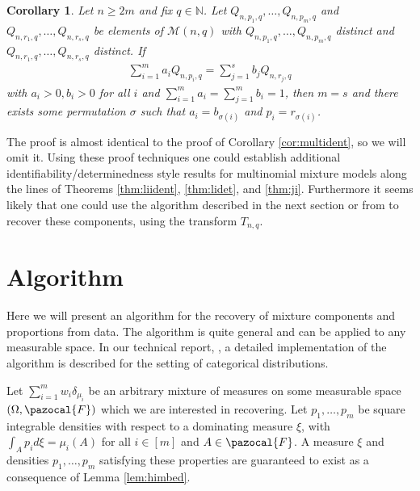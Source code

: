 \documentclass[aos,preprint]{imsart}
\def\nn{\mathbb{N}}
\def\sF{\pazocal{F}}
\def\sM{\pazocal{M}}
\def\sM{\mathscr{M}}
\theoremstyle{plain}
\newtheorem{cor}{Corollary}[section]
\theoremstyle{defintion}
\begin{document}
\begin{cor} \label{cor:multdet}
	Let $n\ge2m$ and fix $q\in \nn$. Let $Q_{n,p_1,q},\ldots,Q_{n,p_m,q}$ and $Q_{n,r_1,q},\ldots,Q_{n,r_s,q}$ be elements of $\sM\left( n,q \right)$ with $Q_{n,p_1,q},\ldots,Q_{n,p_m,q}$ distinct and $Q_{n,r_1,q},\ldots,Q_{n,r_s,q}$ distinct. If
	\begin{eqnarray*}
		\sum_{i=1}^m a_i Q_{n,p_i,q} = \sum_{j=1}^s b_j Q_{n,r_j,q}
	\end{eqnarray*} 
	with $a_i>0,b_i> 0$ for all $i$ and $\sum_{i=1}^m a_i = \sum_{j=1}^m b_i= 1$, then $m=s$ and there exists some permutation $\sigma$ such that $a_i = b_{\sigma(i)}$ and $p_i = r_{\sigma(i)}$. 

\end{cor}
The proof is almost identical to the proof of Corollary \ref{cor:multident}, so we will omit it. Using these proof techniques one could establish additional identifiability/determinedness style results for multinomial mixture models along the lines of Theorems \ref{thm:liident}, \ref{thm:lidet}, and \ref{thm:ji}. Furthermore it seems likely that one could use the algorithm described in the next section or from \cite{anandkumar14,arora12, rabani14} to recover these components, using the transform $T_{n,q}$.
\section{Algorithm} \label{sec:algorithm}
Here we will present an algorithm for the recovery of mixture components and proportions from data. The algorithm is quite general and can be applied to any measurable space. In our technical report, \cite{arxiv16}, a detailed implementation of the algorithm is described for the setting of categorical distributions.

Let $\sum_{i=1}^m w_i \delta_{\mu_i}$ be an arbitrary mixture of measures on some measurable space $(\Omega,\sF)$ which we are interested in recovering. Let $p_1,\ldots,p_m$ be square integrable densities with respect to a dominating measure $\xi$, with $\int_A p_i d\xi = \mu_i\left( A \right)$ for all $i \in [m]$ and $A \in \sF$. A measure $\xi$ and densities $p_1,\ldots,p_m$ satisfying these properties are guaranteed to exist as a consequence of Lemma \ref{lem:himbed}.
\end{document}
